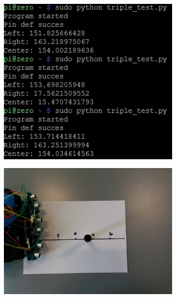 \begin{figure}[H]
	\centering
	\begin{subfigure}[H]{0.4\textwidth}
		\includegraphics[width=\textwidth]{images/test-blindspotcmd.jpg}
		\label{bs-read}
	\end{subfigure}%
	\quad
	\begin{subfigure}[H]{0.5\textwidth}
		\includegraphics[width=\textwidth]{images/blindspot_test.jpg}
		\label{bs-test}
	\end{subfigure}%
	\quad
\end{figure}



